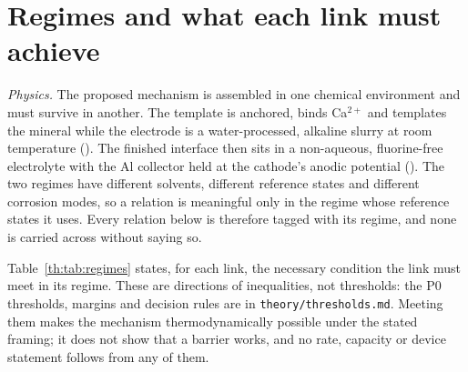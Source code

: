 
\section{Regimes and what each link must achieve}\label{th:sec:regimes}

\textit{Physics.} The proposed mechanism is assembled in one chemical environment and must
survive in another. The template is anchored, binds Ca$^{2+}$ and templates the mineral while
the electrode is a water-processed, alkaline slurry at room temperature (\Rs). The finished
interface then sits in a non-aqueous, fluorine-free electrolyte with the Al collector held at
the cathode's anodic potential (\Rc). The two regimes have different solvents, different
reference states and different corrosion modes, so a relation is meaningful only in the regime
whose reference states it uses. Every relation below is therefore tagged with its regime, and
none is carried across without saying so.

Table~\ref{th:tab:regimes} states, for each link, the necessary condition the link must meet
in its regime. These are directions of inequalities, not thresholds: the P0 thresholds, margins and
decision rules are in \texttt{theory/thresholds.md}. Meeting them makes the mechanism thermodynamically possible under the
stated framing; it does not show that a barrier works, and no rate, capacity or device statement
follows from any of them.

